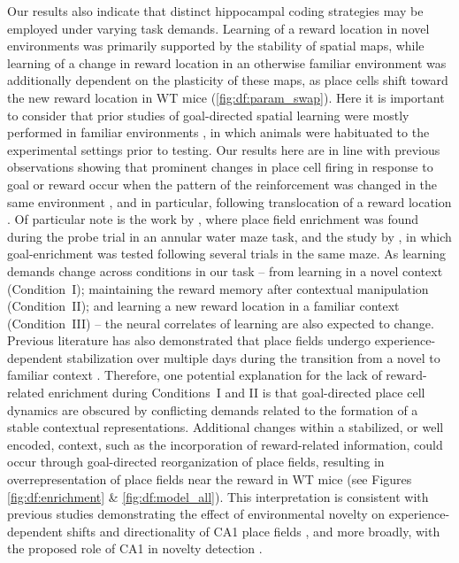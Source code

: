 Our results also indicate that distinct hippocampal coding strategies may be employed under varying task demands. Learning of a reward location in novel environments was primarily supported by the stability of spatial maps, while learning of a change in reward location in an otherwise familiar environment was additionally dependent on the plasticity of these maps, as place cells shift toward the new reward location in WT mice (\autoref{fig:df:param_swap}). Here it is important to consider that prior studies of goal-directed spatial learning were mostly performed in familiar environments \citep{Breese1989, Dupret2010a, Fyhn2002, Hok2007, Hollup2001b, Kobayashi1997}, in which animals were habituated to the experimental settings prior to testing. Our results here are in line with previous observations showing that prominent changes in place cell firing in response to goal or reward occur when the pattern of the reinforcement was changed in the same environment \citep{Breese1989, Fyhn2002, Kobayashi1997, Markus1995}, and in particular, following translocation of a reward location \citep{Breese1989, Kobayashi1997}. Of particular note is the work by \citeauthor{Hollup2001a}, where place field enrichment was found during the probe trial in an annular water maze task, and the study by \citeauthor{Dupret2010a}, in which goal-enrichment was tested following several trials in the same maze. As learning demands change across conditions in our task -- from learning in a novel context (Condition~I); maintaining the reward memory after contextual manipulation (Condition~II); and learning a new reward location in a familiar context (Condition~III) -- the neural correlates of learning are also expected to change. Previous literature has also demonstrated that place fields undergo experience-dependent stabilization over multiple days during the transition from a novel to familiar context \citep{Cacucci2007, Frank2004, Hill1978, Karlsson2008, Leutgeb2004, Wilson1993}. Therefore, one potential explanation for the lack of reward-related enrichment during Conditions~I and II is that goal-directed place cell dynamics are obscured by conflicting demands related to the formation of a stable contextual representations. Additional changes within a stabilized, or well encoded, context, such as the incorporation of reward-related information, could occur through goal-directed reorganization of place fields, resulting in overrepresentation of place fields near the reward in WT mice (see Figures \ref{fig:df:enrichment} \& \ref{fig:df:model_all}). This interpretation is consistent with previous studies demonstrating the effect of environmental novelty on experience-dependent shifts and directionality of CA1 place fields \citep{Mehta1997, Navratilova2012, Roth2012, Lee2007}, and more broadly, with the proposed role of CA1 in novelty detection \citep{Duncan2012, Karlsson2008, Larkin2014, Nitz2004, Vinogradova2001, Lever2002a}.

